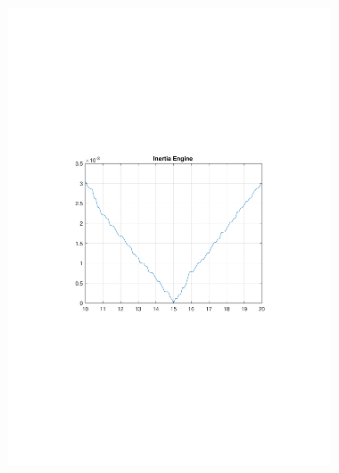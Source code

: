 \documentclass{beamer}
\begin{document}
\begin{frame}
	\begin{columns}[t]
			\begin{figure}
				\centering
				\includegraphics[trim=4cm 9cm 4cm 9cm, clip=true, width=\linewidth]{img/inertia_engine}
			\end{figure}
			\begin{figure}
				\centering

\end{figure}
\end{columns}
\end{frame}
\end{document}
